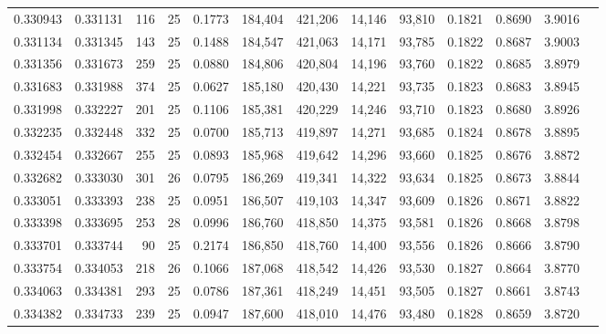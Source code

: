 \begin{tabular}{rrrrrrrrrrrrr}
0.330943 & 0.331131 &   116 &  25 &                                     0.1773 & 184,404 & 421,206 &  14,146 &  93,810 & 0.1821 & 0.8690 & 3.9016 \\
0.331134 & 0.331345 &   143 &  25 &                                     0.1488 & 184,547 & 421,063 &  14,171 &  93,785 & 0.1822 & 0.8687 & 3.9003 \\
0.331356 & 0.331673 &   259 &  25 &                                     0.0880 & 184,806 & 420,804 &  14,196 &  93,760 & 0.1822 & 0.8685 & 3.8979 \\
0.331683 & 0.331988 &   374 &  25 &                                     0.0627 & 185,180 & 420,430 &  14,221 &  93,735 & 0.1823 & 0.8683 & 3.8945 \\
0.331998 & 0.332227 &   201 &  25 &                                     0.1106 & 185,381 & 420,229 &  14,246 &  93,710 & 0.1823 & 0.8680 & 3.8926 \\
0.332235 & 0.332448 &   332 &  25 &                                     0.0700 & 185,713 & 419,897 &  14,271 &  93,685 & 0.1824 & 0.8678 & 3.8895 \\
0.332454 & 0.332667 &   255 &  25 &                                     0.0893 & 185,968 & 419,642 &  14,296 &  93,660 & 0.1825 & 0.8676 & 3.8872 \\
0.332682 & 0.333030 &   301 &  26 &                                     0.0795 & 186,269 & 419,341 &  14,322 &  93,634 & 0.1825 & 0.8673 & 3.8844 \\
0.333051 & 0.333393 &   238 &  25 &                                     0.0951 & 186,507 & 419,103 &  14,347 &  93,609 & 0.1826 & 0.8671 & 3.8822 \\
0.333398 & 0.333695 &   253 &  28 &                                     0.0996 & 186,760 & 418,850 &  14,375 &  93,581 & 0.1826 & 0.8668 & 3.8798 \\
0.333701 & 0.333744 &    90 &  25 &                                     0.2174 & 186,850 & 418,760 &  14,400 &  93,556 & 0.1826 & 0.8666 & 3.8790 \\
0.333754 & 0.334053 &   218 &  26 &                                     0.1066 & 187,068 & 418,542 &  14,426 &  93,530 & 0.1827 & 0.8664 & 3.8770 \\
0.334063 & 0.334381 &   293 &  25 &                                     0.0786 & 187,361 & 418,249 &  14,451 &  93,505 & 0.1827 & 0.8661 & 3.8743 \\
0.334382 & 0.334733 &   239 &  25 &                                     0.0947 & 187,600 & 418,010 &  14,476 &  93,480 & 0.1828 & 0.8659 & 3.8720 \\

\end{tabular}

